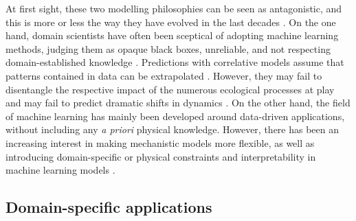 At first sight, these two modelling philosophies can be seen as antagonistic, and this is more or less the way they have evolved in the last decades \cite{zdeborova_understanding_2020}. 
On the one hand, domain scientists have often been sceptical of adopting machine learning methods, judging them as opaque black boxes, unreliable, and not respecting domain-established knowledge \cite{Coveney:2016eb}. Predictions with correlative models assume that patterns contained in data can be extrapolated \cite{dormann2007}. However, they may fail to disentangle the respective impact of the numerous ecological processes at play and may fail to predict dramatic shifts in dynamics \cite{Barnosky2012}.
On the other hand, the field of machine learning has mainly been developed around data-driven applications, without including any \textit{a priori} physical knowledge. 
However, there has been an increasing interest in making mechanistic models more flexible, as well as introducing domain-specific or physical constraints and interpretability in machine learning models \cite{Molnar.2020sisk,Rudin.2022,Schneider2017,rasp2018,Yazdani2020,Abarbanel2018,Carrassi2018,Bocquet2019,Gabor2015,Gharamti2017,Curtsdotter2019,Rosenbaum2019,Toms2020,Brajard2021}.


\subsection{Domain-specific applications}

